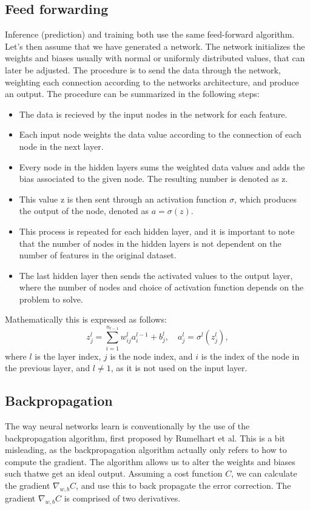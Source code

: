 \subsection*{Feed forwarding}
Inference (prediction) and training both use the same feed-forward algorithm. Let's then assume that we have generated a 
network. The network initializes the weights and biases usually with normal or uniformly distributed values, that can 
later be adjusted. The procedure is to send the data through the network, weighting each connection according to the networks 
architecture, and produce an output. The procedure can be summarized in the following steps\cite{FYSSTK}:
 \begin{itemize}
    \item The data is recieved by the input nodes in the network for each feature.
    \item Each input node weights the data value according to the connection of each node in the next layer.
    \item Every node in the hidden layers sums the weighted data values and adds the bias associated to the given node. The resulting number is denoted as z. 
    \item This value z is then sent through an activation function $\sigma$, which produces the output of the node, denoted as $a = \sigma(z)$.
    \item This process is repeated for each hidden layer, and it is important to note that the number of nodes in the hidden layers is not dependent on the number of features in the original dataset. 
    \item The last hidden layer then sends the activated values to the output layer, where the number of nodes and choice of activation function depends on the problem to solve.
 \end{itemize}

Mathematically this is expressed as follows:
\begin{equation}
    z_j^l = \sum_{i=1}^{n_{l-1}} w_{ij}^l a_i^{l-1} + b_j^l, \quad a_j^l = \sigma^l(z_j^l),
\end{equation}
where $l$ is the layer index, $j$ is the node index, and $i$ is the index of the node in the previous layer, 
and $l \neq 1$, as it is not used on the input layer.


\subsection*{Backpropagation}
The way neural networks learn is conventionally by the use of the backpropagation algorithm, first proposed by 
Rumelhart et al\cite{backprop}. This is a bit misleading, as the backpropagation algorithm actually only refers 
to how to compute the gradient\cite{Goodfellow-et-al-2016}. The algorithm allows us to alter the weights and 
biases such thatwe get an ideal output. Assuming a cost function $C$, we can calculate the gradient $\nabla_{w, b}C$,
and use this to back propagate the error correction. The gradient $\nabla_{w, b}C$ is comprised of two derivatives.
 


